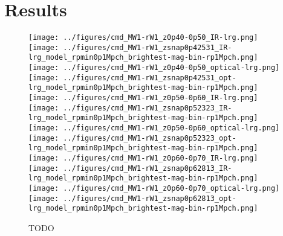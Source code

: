 \documentclass[twocolumn,apj,iop,tighten]{emulateapj2}
\begin{document}
\section{Results}\label{sec:results}

\begin{figure*}
\centering
\texttt{[image: ../figures/cmd\_MW1-rW1\_z0p40-0p50\_IR-lrg.png]}
\texttt{[image: ../figures/cmd\_MW1-rW1\_zsnap0p42531\_IR-lrg\_model\_rpmin0p1Mpch\_brightest-mag-bin-rp1Mpch.png]}
\texttt{[image: ../figures/cmd\_MW1-rW1\_z0p40-0p50\_optical-lrg.png]}
\texttt{[image: ../figures/cmd\_MW1-rW1\_zsnap0p42531\_opt-lrg\_model\_rpmin0p1Mpch\_brightest-mag-bin-rp1Mpch.png]}
\\
\texttt{[image: ../figures/cmd\_MW1-rW1\_z0p50-0p60\_IR-lrg.png]}
\texttt{[image: ../figures/cmd\_MW1-rW1\_zsnap0p52323\_IR-lrg\_model\_rpmin0p1Mpch\_brightest-mag-bin-rp1Mpch.png]}
\texttt{[image: ../figures/cmd\_MW1-rW1\_z0p50-0p60\_optical-lrg.png]}
\texttt{[image: ../figures/cmd\_MW1-rW1\_zsnap0p52323\_opt-lrg\_model\_rpmin0p1Mpch\_brightest-mag-bin-rp1Mpch.png]}
\\
\texttt{[image: ../figures/cmd\_MW1-rW1\_z0p60-0p70\_IR-lrg.png]}
\texttt{[image: ../figures/cmd\_MW1-rW1\_zsnap0p62813\_IR-lrg\_model\_rpmin0p1Mpch\_brightest-mag-bin-rp1Mpch.png]}
\texttt{[image: ../figures/cmd\_MW1-rW1\_z0p60-0p70\_optical-lrg.png]}
\texttt{[image: ../figures/cmd\_MW1-rW1\_zsnap0p62813\_opt-lrg\_model\_rpmin0p1Mpch\_brightest-mag-bin-rp1Mpch.png]}
\caption{TODO
}
\label{fig:cmd_ir_lrg}
\end{figure*}
\end{document}
